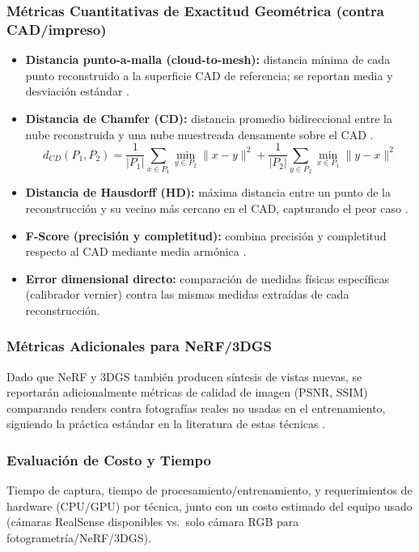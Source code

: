 \documentclass[11pt]{article}
\begin{document}
\subsubsection*{M\'etricas Cuantitativas de Exactitud Geom\'etrica (contra CAD/impreso)}
\begin{itemize}
    \item \textbf{Distancia punto-a-malla (cloud-to-mesh):} distancia m\'inima de cada punto reconstruido a la superficie CAD de referencia; se reportan media y desviaci\'on est\'andar \cite{sdf2sdf,scanner_sim}.
    \item \textbf{Distancia de Chamfer (CD):} distancia promedio bidireccional entre la nube reconstruida y una nube muestreada densamente sobre el CAD \cite{chamfer_survey,plant_reconstruction}.
    \[
    d_{CD}(P_1, P_2) = \frac{1}{|P_1|}\sum_{x \in P_1} \min_{y \in P_2} \lVert x-y \rVert^2 + \frac{1}{|P_2|}\sum_{y \in P_2} \min_{x \in P_1} \lVert y-x \rVert^2
    \]
    \item \textbf{Distancia de Hausdorff (HD):} m\'axima distancia entre un punto de la reconstrucci\'on y su vecino m\'as cercano en el CAD, capturando el peor caso \cite{nerf_sfm_comparison}.
    \item \textbf{F-Score (precisi\'on y completitud):} combina precisi\'on y completitud respecto al CAD mediante media arm\'onica \cite{point_cloud_completion_survey,asset_inspection_benchmark}.
    \item \textbf{Error dimensional directo:} comparaci\'on de medidas f\'isicas espec\'ificas (calibrador vernier) contra las mismas medidas extra\'idas de cada reconstrucci\'on.
\end{itemize}

\subsubsection*{M\'etricas Adicionales para NeRF/3DGS}
Dado que NeRF y 3DGS tambi\'en producen s\'intesis de vistas nuevas, se reportar\'an adicionalmente m\'etricas de calidad de imagen (PSNR, SSIM) comparando renders contra fotograf\'ias reales no usadas en el entrenamiento, siguiendo la pr\'actica est\'andar en la literatura de estas t\'ecnicas \cite{nerf_gs_sfm_heritage}.

\subsubsection*{Evaluaci\'on de Costo y Tiempo}
Tiempo de captura, tiempo de procesamiento/entrenamiento, y requerimientos de hardware (CPU/GPU) por t\'ecnica, junto con un costo estimado del equipo usado (c\'amaras RealSense disponibles vs.\ solo c\'amara RGB para fotogrametr\'ia/NeRF/3DGS).
\end{document}

